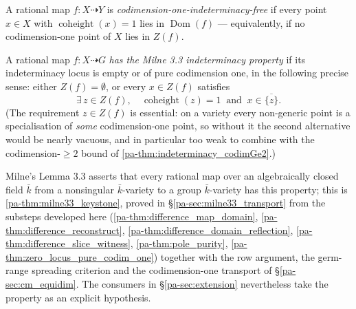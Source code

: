 \begin{definition}
  \label{pa-def:codim_one_free}
  \leanok

  A rational map \(f : X \dashrightarrow Y\) is
  \emph{codimension-one-indeterminacy-free} if every point \(x \in X\) with
  \(\operatorname{coheight}(x) = 1\) lies in \(\operatorname{Dom}(f)\) ---
  equivalently, if no codimension-one point of \(X\) lies in \(Z(f)\).
\end{definition}

\begin{definition}
  \label{pa-def:milne33_indeterminacy}
  \leanok

  A rational map \(f : X \dashrightarrow G\) \emph{has the Milne 3.3
  indeterminacy property} if its indeterminacy locus is empty or of pure
  codimension one, in the following precise sense: either
  \(Z(f) = \emptyset\), or every \(x \in Z(f)\) satisfies
  \[
    \exists\, z \in Z(f), \quad \operatorname{coheight}(z) = 1
    \ \text{ and }\ x \in \overline{\{z\}} .
  \]
  (The requirement \(z \in Z(f)\) is essential: on a variety every non-generic
  point is a specialisation of \emph{some} codimension-one point, so without it
  the second alternative would be nearly vacuous, and in particular too weak to
  combine with the codimension-\(\geq 2\) bound of
  \ref{pa-thm:indeterminacy_codimGe2}.)

  Milne's Lemma 3.3 asserts that every rational map over an algebraically
  closed field \(\bar k\) from a nonsingular \(\bar k\)-variety to a group
  \(\bar k\)-variety has this property; this is \ref{pa-thm:milne33_keystone},
  proved in \S\ref{pa-sec:milne33_transport} from the substeps developed here
  (\ref{pa-thm:difference_map_domain}, \ref{pa-thm:difference_reconstruct},
  \ref{pa-thm:difference_domain_reflection}, \ref{pa-thm:difference_slice_witness},
  \ref{pa-thm:pole_purity}, \ref{pa-thm:zero_locus_pure_codim_one}) together with the
  row argument, the germ-range spreading criterion and the codimension-one
  transport of \S\ref{pa-sec:cm_equidim}. The consumers in \S\ref{pa-sec:extension}
  nevertheless take the property as an explicit hypothesis.
\end{definition}

